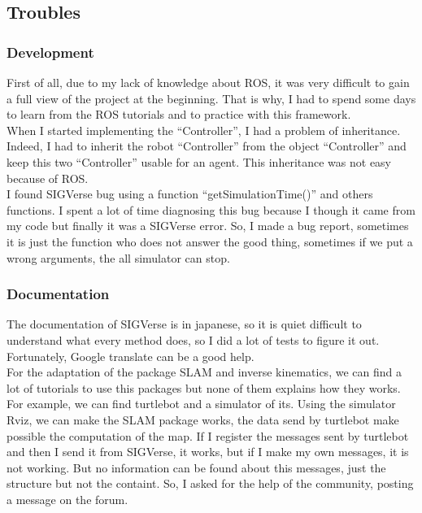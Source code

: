 \subsection{Troubles}
\subsubsection{Development}
First of all, due to my lack of knowledge about ROS, it was very difficult to gain a full view of the project at the beginning. That is why, I had to spend some days to learn from the ROS tutorials and to practice with this framework.\\
When I started implementing the ``Controller'', I had a problem of inheritance. Indeed, I had to inherit the robot ``Controller'' from the object ``Controller'' and keep this two ``Controller'' usable for an agent. This inheritance was not easy because of ROS.\\
I found SIGVerse bug using a function ``getSimulationTime()'' and others functions. I spent a lot of time diagnosing this bug because I though it came from my code but finally it was a SIGVerse error. So, I made a bug report, sometimes it is just the function who does not answer the good thing, sometimes if we put a wrong arguments, the all simulator can stop.

\subsubsection{Documentation}
The documentation of SIGVerse is in japanese, so it is quiet difficult to understand what every method does, so I did a lot of tests to figure it out. Fortunately, Google translate can be a good help.\\

For the adaptation of the package SLAM and inverse kinematics, we can find a lot of tutorials to use this packages but none of them explains how they works.\\
For example, we can find turtlebot and a simulator of its. Using the simulator Rviz, we can make the SLAM package works, the data send by turtlebot make possible the computation of the map. If I register the messages sent by turtlebot and then I send it from SIGVerse, it works, but if I make my own messages, it is not working. But no information can be found about this messages, just the structure but not the containt. So, I asked for the help of the community, posting a message on the forum.\\

